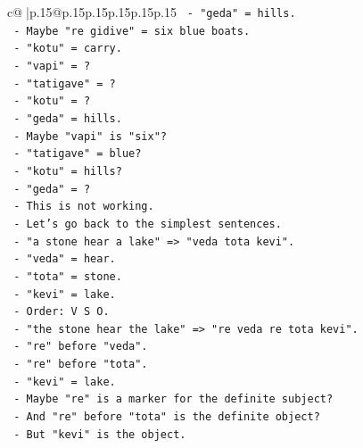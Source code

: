 \documentclass{article}
\begin{document}
{\begin{supertabular}{c@{$\;$}|p{.15\linewidth}@{}p{.15\linewidth}p{.15\linewidth}p{.15\linewidth}p{.15\linewidth}p{.15\linewidth}}
{{{\texttt{                           {-} "geda" = hills.} \\
\texttt{                           {-} Maybe "re gidive" = six blue boats.} \\
\texttt{                           {-} "kotu" = carry.} \\
\texttt{                           {-} "vapi" = ?} \\
\texttt{                           {-} "tatigave" = ?} \\
\texttt{                           {-} "kotu" = ?} \\
\texttt{                           {-} "geda" = hills.} \\
\texttt{                           {-} Maybe "vapi" is "six"?} \\
\texttt{                           {-} "tatigave" = blue?} \\
\texttt{                           {-} "kotu" = hills?} \\
\texttt{                           {-} "geda" = ?} \\
\texttt{                           {-} This is not working.} \\
\texttt{                         {-} Let's go back to the simplest sentences.} \\
\texttt{                         {-} "a stone hear a lake" => "veda tota kevi".} \\
\texttt{                           {-} "veda" = hear.} \\
\texttt{                           {-} "tota" = stone.} \\
\texttt{                           {-} "kevi" = lake.} \\
\texttt{                           {-} Order: V S O.} \\
\texttt{                         {-} "the stone hear the lake" => "re veda re tota kevi".} \\
\texttt{                           {-} "re" before "veda".} \\
\texttt{                           {-} "re" before "tota".} \\
\texttt{                           {-} "kevi" = lake.} \\
\texttt{                           {-} Maybe "re" is a marker for the definite subject?} \\
\texttt{                           {-} And "re" before "tota" is the definite object?} \\
\texttt{                           {-} But "kevi" is the object.} \\
}}}
\end{supertabular}}
\end{document}
